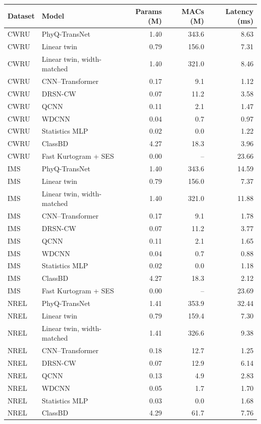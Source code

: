\begin{tabular}{llrrr}
\toprule
Dataset & Model & Params (M) & MACs (M) & Latency (ms) \\
\midrule
CWRU & PhyQ-TransNet & 1.40 & 343.6 & 8.63 \\
CWRU & Linear twin & 0.79 & 156.0 & 7.31 \\
CWRU & Linear twin, width-matched & 1.40 & 321.0 & 8.46 \\
CWRU & CNN--Transformer & 0.17 & 9.1 & 1.12 \\
CWRU & DRSN-CW & 0.07 & 11.2 & 3.58 \\
CWRU & QCNN & 0.11 & 2.1 & 1.47 \\
CWRU & WDCNN & 0.04 & 0.7 & 0.97 \\
CWRU & Statistics MLP & 0.02 & 0.0 & 1.22 \\
CWRU & ClassBD & 4.27 & 18.3 & 3.96 \\
CWRU & Fast Kurtogram + SES & 0.00 & -- & 23.66 \\
IMS & PhyQ-TransNet & 1.40 & 343.6 & 14.59 \\
IMS & Linear twin & 0.79 & 156.0 & 7.37 \\
IMS & Linear twin, width-matched & 1.40 & 321.0 & 11.88 \\
IMS & CNN--Transformer & 0.17 & 9.1 & 1.78 \\
IMS & DRSN-CW & 0.07 & 11.2 & 3.77 \\
IMS & QCNN & 0.11 & 2.1 & 1.65 \\
IMS & WDCNN & 0.04 & 0.7 & 0.88 \\
IMS & Statistics MLP & 0.02 & 0.0 & 1.18 \\
IMS & ClassBD & 4.27 & 18.3 & 2.12 \\
IMS & Fast Kurtogram + SES & 0.00 & -- & 23.69 \\
NREL & PhyQ-TransNet & 1.41 & 353.9 & 32.44 \\
NREL & Linear twin & 0.79 & 159.4 & 7.30 \\
NREL & Linear twin, width-matched & 1.41 & 326.6 & 9.38 \\
NREL & CNN--Transformer & 0.18 & 12.7 & 1.25 \\
NREL & DRSN-CW & 0.07 & 12.9 & 6.14 \\
NREL & QCNN & 0.13 & 4.9 & 2.83 \\
NREL & WDCNN & 0.05 & 1.7 & 1.70 \\
NREL & Statistics MLP & 0.03 & 0.0 & 1.68 \\
NREL & ClassBD & 4.29 & 61.7 & 7.76 \\

\end{tabular}
